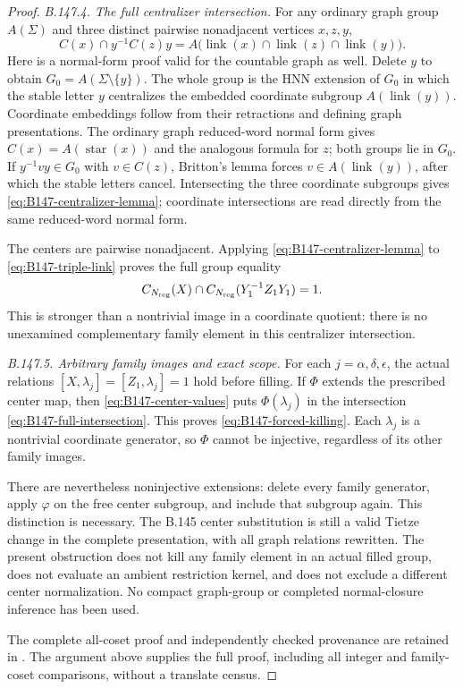 \begin{proof}
\emph{B.147.4. The full centralizer intersection.}
For any ordinary graph group $A(\Sigma)$ and three distinct
pairwise nonadjacent vertices $x,z,y$,
\begin{equation}\label{eq:B147-centralizer-lemma}
 C(x)\cap y^{-1}C(z)y
       =A\bigl(\operatorname{link}(x)\cap\operatorname{link}(z)
                                      \cap\operatorname{link}(y)\bigr).
\end{equation}
Here is a normal-form proof valid for the countable graph as well.
Delete $y$ to obtain $G_0=A(\Sigma\setminus\{y\})$.
The whole group is the HNN extension of $G_0$ in which the stable
letter $y$ centralizes the embedded coordinate subgroup
$A(\operatorname{link}(y))$. Coordinate embeddings follow from
their retractions and defining graph presentations. The ordinary
graph reduced-word normal form gives
$C(x)=A(\operatorname{star}(x))$ and the analogous formula for
$z$; both groups lie in $G_0$. If $y^{-1}vy\in G_0$ with
$v\in C(z)$, Britton's lemma forces
$v\in A(\operatorname{link}(y))$, after which the stable letters
cancel. Intersecting the three coordinate subgroups gives
\eqref{eq:B147-centralizer-lemma}; coordinate intersections are
read directly from the same reduced-word normal form.

The centers are pairwise nonadjacent. Applying
\eqref{eq:B147-centralizer-lemma} to
\eqref{eq:B147-triple-link} proves the full group equality
\begin{equation}\label{eq:B147-full-intersection}
 C_{N_{\rm reg}}(X)\cap
 C_{N_{\rm reg}}(Y_1^{-1}Z_1Y_1)=1.
\end{equation}
This is stronger than a nontrivial image in a coordinate quotient:
there is no unexamined complementary family element in this
centralizer intersection.

\emph{B.147.5. Arbitrary family images and exact scope.}
For each $j=\alpha,\delta,\epsilon$, the actual relations
$[X,\lambda_j]=[Z_1,\lambda_j]=1$ hold before filling. If
$\Phi$ extends the prescribed center map, then
\eqref{eq:B147-center-values} puts $\Phi(\lambda_j)$ in the
intersection \eqref{eq:B147-full-intersection}. This proves
\eqref{eq:B147-forced-killing}. Each $\lambda_j$ is a nontrivial
coordinate generator, so $\Phi$ cannot be injective, regardless
of its other family images.

There are nevertheless noninjective extensions: delete every
family generator, apply $\varphi$ on the free center subgroup,
and include that subgroup again. This distinction is necessary.
The B.145 center substitution is still a valid Tietze change in
the complete presentation, with all graph relations rewritten.
The present obstruction does not kill any family element in an
actual filled group, does not evaluate an ambient restriction
kernel, and does not exclude a different center normalization.
No compact graph-group or completed normal-closure inference
has been used.

The complete all-coset proof and independently checked provenance
are retained in
.
The argument above supplies the full proof, including all integer
and family-coset comparisons, without a translate census.
\end{proof}
